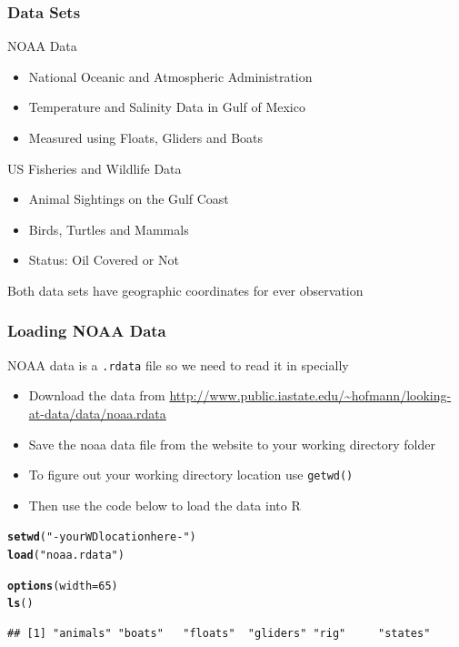 \documentclass{beamer}\usepackage[]{graphicx}\usepackage[]{color}
\makeatletter
\newcommand{\hlnum}[1]{\textcolor[rgb]{0.686,0.059,0.569}{#1}}%
\newcommand{\hlstr}[1]{\textcolor[rgb]{0.192,0.494,0.8}{#1}}%
\newcommand{\hlstd}[1]{\textcolor[rgb]{0.345,0.345,0.345}{#1}}%
\newcommand{\hlkwc}[1]{\textcolor[rgb]{0.333,0.667,0.333}{#1}}%
\newcommand{\hlkwd}[1]{\textcolor[rgb]{0.737,0.353,0.396}{\textbf{#1}}}%
\newenvironment{kframe}{%
 \def\at@end@of@kframe{}%
 \ifinner\ifhmode%
  \def\at@end@of@kframe{\end{minipage}}%
  \begin{minipage}{\columnwidth}%
 \fi\fi%
 \def\FrameCommand##1{\hskip\@totalleftmargin \hskip-\fboxsep
 \colorbox{shadecolor}{##1}\hskip-\fboxsep
     \hskip-\linewidth \hskip-\@totalleftmargin \hskip\columnwidth}%
 \MakeFramed {\advance\hsize-\width
   \@totalleftmargin\z@ \linewidth\hsize
   \@setminipage}}%
 {\par\unskip\endMakeFramed%
 \at@end@of@kframe}
\newenvironment{knitrout}{}{} %
\makeatother
\begin{document}
\begin{frame}
\frametitle{Data Sets}

NOAA Data
\begin{itemize}
    \item National Oceanic and Atmospheric Administration
    \item Temperature and Salinity Data in Gulf of Mexico
    \item Measured using Floats, Gliders and Boats
\end{itemize} 
\medskip
US Fisheries and Wildlife Data
\begin{itemize}
    \item Animal Sightings on the Gulf Coast
    \item Birds, Turtles and Mammals
    \item Status: Oil Covered or Not
\end{itemize} 
Both data sets have geographic coordinates for ever observation
\end{frame}


\begin{frame}[fragile]
\frametitle{Loading NOAA Data}
NOAA data is a \texttt{.rdata} file so we need to read it in specially
   \begin{itemize}
    \item Download the data from {\small\url{http://www.public.iastate.edu/~hofmann/looking-at-data/data/noaa.rdata}}
    \item Save the noaa data file from the website to your working directory folder
    \item To figure out your working directory location use \texttt{getwd()}
    \item Then use the code below to load the data into R
\end{itemize} 
\small
\begin{knitrout}\footnotesize
{}\color{fgcolor}\begin{kframe}
\begin{alltt}
  \hlkwd{setwd}\hlstd{(}\hlstr{" - your WD location here - "}\hlstd{)}
  \hlkwd{load}\hlstd{(}\hlstr{"noaa.rdata"}\hlstd{)}
\end{alltt}
\end{kframe}
\end{knitrout}
\vspace{-25pt}
\begin{knitrout}\footnotesize
{}\color{fgcolor}\begin{kframe}
\begin{alltt}
\hlkwd{options}\hlstd{(}\hlkwc{width}\hlstd{=}\hlnum{65}\hlstd{)}
  \hlkwd{ls}\hlstd{()}
\end{alltt}
\begin{verbatim}
## [1] "animals" "boats"   "floats"  "gliders" "rig"     "states"
\end{verbatim}
\end{kframe}
\end{knitrout}
    \normalsize
\end{frame}
\end{document}
